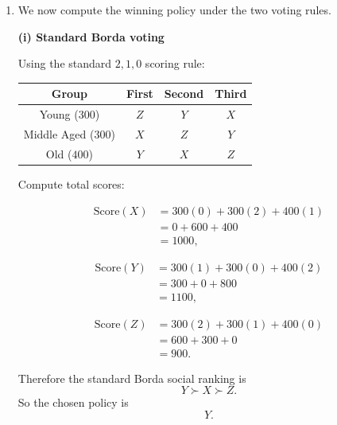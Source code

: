 \documentclass[12pt]{article}
\begin{document}
\begin{enumerate}[label=(\alph*)]
    Summing across all voters, the total weighted Borda score of \(A\) must exceed that of \(B\). Therefore the social ranking also places \(A\) above \(B\).

    Hence:
    \[
    \boxed{\text{The modified Borda rule satisfies the Pareto condition.}}
    \]

    \item
    We now compute the winning policy under the two voting rules.

    \textbf{(i) Standard Borda voting}

    Using the standard \(2,1,0\) scoring rule:

    \begin{center}
    \begin{tabular}{c|ccc}
    \toprule
    Group & First & Second & Third\\
    \midrule
    Young (\(300\)) & \(Z\) & \(Y\) & \(X\)\\
    Middle Aged (\(300\)) & \(X\) & \(Z\) & \(Y\)\\
    Old (\(400\)) & \(Y\) & \(X\) & \(Z\)\\
    \bottomrule
    \end{tabular}
    \end{center}

    Compute total scores:

    \[
    \begin{aligned}
    \text{Score}(X)
    &=300(0)+300(2)+400(1) \\
    &=0+600+400 \\
    &=1000,
    \end{aligned}
    \]

    \[
    \begin{aligned}
    \text{Score}(Y)
    &=300(1)+300(0)+400(2) \\
    &=300+0+800 \\
    &=1100,
    \end{aligned}
    \]

    \[
    \begin{aligned}
    \text{Score}(Z)
    &=300(2)+300(1)+400(0) \\
    &=600+300+0 \\
    &=900.
    \end{aligned}
    \]

    Therefore the standard Borda social ranking is
    \[
    Y \succ X \succ Z.
    \]
    So the chosen policy is
    \[
    \boxed{Y.}
    \]

    \bigskip


\end{enumerate}
\end{document}
